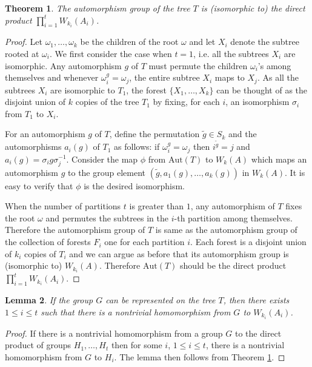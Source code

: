 \documentclass[a4paper,11pt]{article}
\newtheorem{theorem}{Theorem}[section]
\newtheorem{lemma}[theorem]{Lemma}
\newcommand{\Aut}[1]{\ensuremath{\mathrm{Aut}\left(#1\right)}}
\begin{document}
\begin{theorem}\label{thmtreeauto}
  The automorphism group of the tree $T$ is (isomorphic to) the direct
  product $\prod_{i=1}^t W_{k_i}(A_i)$.
\end{theorem}
\begin{proof}
  Let $\omega_1,\ldots,\omega_k$ be the children of the root $\omega$
  and let $X_i$ denote the subtree rooted at $\omega_i$. We first
  consider the case when $t=1$, i.e. all the subtrees $X_i$ are
  isomorphic. Any automorphism $g$ of $T$ must permute the children
  $\omega_i$'s among themselves and whenever $\omega_i^g = \omega_j$,
  the entire subtree $X_i$ maps to $X_j$.  As all the subtrees $X_i$
  are isomorphic to $T_1$, the forest $\{X_1,\ldots, X_k\}$ can be
  thought of as the disjoint union of $k$ copies of the tree $T_1$ by
  fixing, for each $i$, an isomorphism $\sigma_i$ from $T_1$ to $X_i$.
  
  For an automorphism $g$ of $T$, define the permutation $\tilde{g}\in
  S_k$ and the automorphisms $a_i(g)$ of $T_1$ as follows: if
  $\omega_i^g = \omega_j$ then $i^{\tilde{g}} = j$ and $a_i(g) =
  \sigma_i g \sigma_j^{-1}$.  Consider the map $\phi$ from $\Aut{T}$
  to $W_k(A)$ which maps an automorphism $g$ to the group element
  $(\tilde{g},a_1(g),\ldots,a_k(g))$ in $W_k (A)$.  It is easy to
  verify that $\phi$ is the desired isomorphism.

  When the number of partitions $t$ is greater than $1$, any
  automorphism of $T$ fixes the root $\omega$ and permutes the
  subtrees in the $i$-th partition among themselves. Therefore the
  automorphism group of $T$ is same as the automorphism group of the
  collection of forests $F_i$ one for each partition $i$. Each forest
  is a disjoint union of $k_i$ copies of $T_i$ and we can argue as
  before that its automorphism group is (isomorphic to)
  $W_{k_i}(A)$. Therefore $\Aut{T}$ should be the direct product
  $\prod_{i=1}^t W_{k_i}(A_i)$.
\end{proof}



\begin{lemma}\label{lem-break1}
  If the group $G$ can be represented on the tree $T$, then there
  exists $1\leq i \leq t$ such that there is a nontrivial homomorphism
  from $G$ to $W_{k_i}(A_i)$.
\end{lemma}

\begin{proof}
  If there is a nontrivial homomorphism from a group $G$ to the direct
  product of groups $H_1,\ldots,H_t$ then for some $i$, $1 \leq i \leq
  t$, there is a nontrivial homomorphism from $G$ to $H_i$. The lemma
  then follows from Theorem \ref{thmtreeauto}.
\end{proof}
\end{document}
